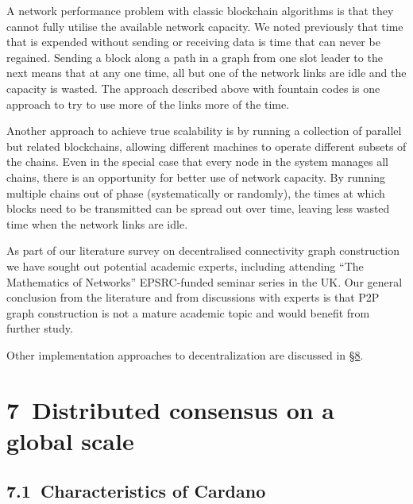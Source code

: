 \documentclass[11pt,a4paper]{article}
\begin{document}
A network performance problem with classic blockchain algorithms is that
they cannot fully utilise the available network capacity. We noted
previously that time that is expended without sending or receiving data
is time that can never be regained. Sending a block along a path in a
graph from one slot leader to the next means that at any one time, all
but one of the network links are idle and the capacity is wasted. The
approach described above with fountain codes is one approach to try to
use more of the links more of the time.

Another approach to achieve true scalability is by running a collection
of parallel but related blockchains, allowing different machines to
operate different subsets of the chains. Even in the special case that
every node in the system manages all chains, there is an opportunity for
better use of network capacity. By running multiple chains out of phase
(systematically or randomly), the times at which blocks need to be
transmitted can be spread out over time, leaving less wasted time when
the network links are idle.

As part of our literature survey on decentralised connectivity graph
construction we have sought out potential academic experts, including
attending ``The Mathematics of Networks'' EPSRC-funded seminar series in
the UK. Our general conclusion from the literature and from discussions
with experts is that P2P graph construction is not a mature academic
topic and would benefit from further study.

Other implementation approaches to decentralization are discussed in
\protect\hyperlink{analysis-of-alternative-approaches}{{§8}}.

\hypertarget{distributed-consensus-on-a-global-scale}{%
\section{​7​~Distributed consensus on a global
scale}\label{distributed-consensus-on-a-global-scale}}

\hypertarget{characteristics-of-cardano}{%
\subsection{​7.1​~Characteristics of
Cardano}\label{characteristics-of-cardano}}
\end{document}
